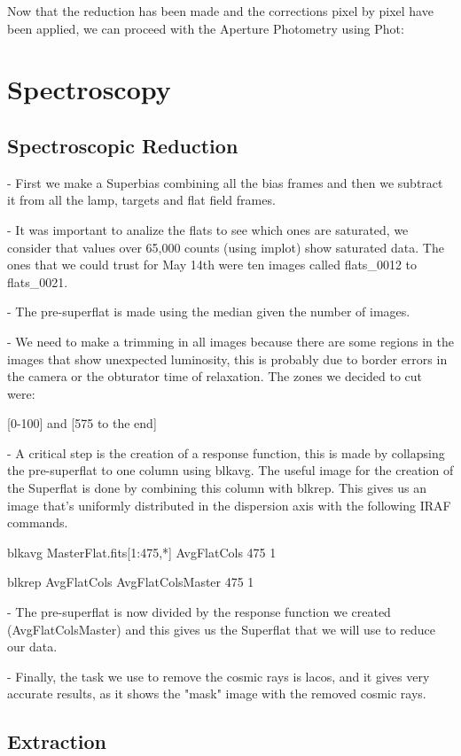 Now that the reduction has been made and the corrections pixel by pixel have been applied, we can proceed with the Aperture Photometry using Phot:



\section{Spectroscopy}


\subsection{Spectroscopic Reduction}

- First we make a Superbias combining all the bias frames and then we subtract it from all the lamp, targets and flat field frames.

- It was important to analize the flats to see which ones are saturated, we consider that values over 65,000 counts (using implot) show saturated data. The ones that we could trust for May 14th were ten images called flats\_0012 to flats\_0021.

- The pre-superflat is made using the median given the number of images.

- We need to make a trimming in all images because there are some regions in the images that show unexpected luminosity, this is probably due to border errors in the camera or the obturator time of relaxation. The zones we decided to cut were:

[0-100] and [575 to the end]

- A critical step is the creation of a response function, this is made by collapsing the pre-superflat to one column using blkavg. The useful image for the creation of the Superflat is done by combining this column with blkrep. This gives us an image that's uniformly distributed in the dispersion axis with the following IRAF commands.

blkavg MasterFlat.fits[1:475,*] AvgFlatCols 475 1

blkrep AvgFlatCols AvgFlatColsMaster 475 1

- The pre-superflat is now divided by the response function we created (AvgFlatColsMaster) and this gives us the Superflat that we will use to reduce our data.

- Finally, the task we use to remove the cosmic rays is lacos, and it gives very accurate results, as it shows the "mask" image with the removed cosmic rays.

\subsection{Extraction}

